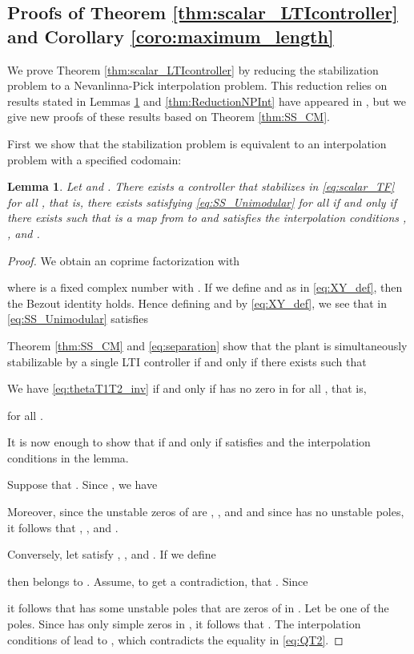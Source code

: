 \documentclass[letterpaper, 12pt, draftcls, onecolumn]{ieeeconf}
\newtheorem{lemma}[theorem]{Lemma}
\begin{document}
\subsection{Proofs of Theorem \ref{thm:scalar_LTIcontroller}
	and Corollary \ref{coro:maximum_length}}
We prove Theorem \ref{thm:scalar_LTIcontroller}
by reducing the stabilization problem 
to a
Nevanlinna-Pick interpolation problem.
This reduction relies on results stated in 
Lemmas \ref{thm:SStoInt} and \ref{thm:ReductionNPInt}
have appeared in \cite{Ghosh1988, Olbrot1994}, 
but we give new proofs of these results 
based on Theorem \ref{thm:SS_CM}.

First we show that
the stabilization problem is equivalent
to an interpolation problem with a specified codomain:
\begin{lemma}
	\label{thm:SStoInt}
	{\it 
		Let  and 
		.
		There exists a controller that stabilizes
		 in \eqref{eq:scalar_TF} 
		for all , that is,
		there exists  satisfying
		\eqref{eq:SS_Unimodular} for all 
		if and only if
		there exists  such that 
		 is a map from  to
		 and
		satisfies
		the interpolation conditions , , 
		and . 
	}
\end{lemma}
\begin{proof}
We obtain an  coprime factorization 
 with

where  is a fixed complex number with . 
If we define  and  as in \eqref{eq:XY_def},
then the Bezout identity  holds.
Hence defining  and  by \eqref{eq:XY_def},
we see that
 in \eqref{eq:SS_Unimodular} satisfies


Theorem \ref{thm:SS_CM} and \eqref{eq:separation} show that
the plant 
is simultaneously stabilizable by a single LTI controller
if and only if there exists  such that

We have \eqref{eq:thetaT1T2_inv} if and only if 
 has no zero in  
for all , that is,

for all .

It is now enough to show that
 if and only if
 satisfies  
and the interpolation conditions in the lemma.

Suppose that . Since
, we have

Moreover,
since the unstable zeros of  are , , and 
and since  has no unstable poles,
it follows that , , and
.

Conversely, let  satisfy 
, , and .
If we define 

then  belongs to .
Assume, to get a contradiction, 
that . Since
 
it follows that
 has some
unstable poles that are zeros of  in . 
Let  be one of the poles.
Since  has only simple zeros in , it follows that
. The interpolation conditions of  lead to
, which contradicts the equality in \eqref{eq:QT2}.
\end{proof}
\end{document}
